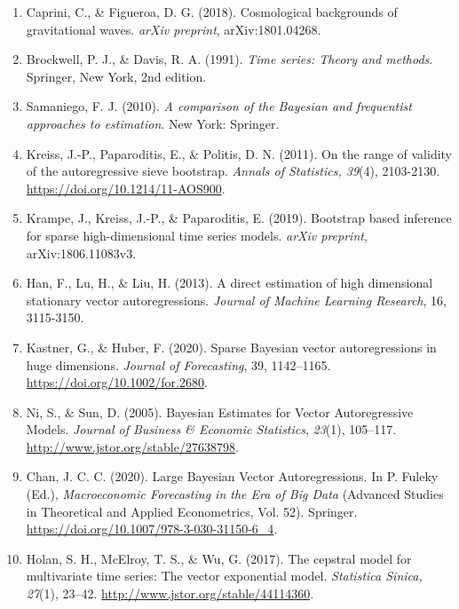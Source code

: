 \documentclass[12pt,a4paper]{article}
\begin{document}
\begin{enumerate}
\item \label{caprini2018} Caprini, C., \& Figueroa, D. G. (2018). Cosmological backgrounds of gravitational waves. \textit{arXiv preprint}, arXiv:1801.04268.

\item \label{BD1991} Brockwell, P. J., \& Davis, R. A. (1991). \emph{Time series: Theory and methods}. Springer, New York, 2nd edition.

\item \label{Samaniego (2010)} Samaniego, F. J. (2010). \emph{A comparison of the Bayesian and frequentist approaches to estimation}. New York: Springer.

\item \label{Kreiss2011} Kreiss, J.-P., Paparoditis, E., \& Politis, D. N. (2011). On the range of validity of the autoregressive sieve bootstrap. \emph{Annals of Statistics, 39}(4), 2103-2130. \url{https://doi.org/10.1214/11-AOS900}.

\item \label{Krampe2019} Krampe, J., Kreiss, J.-P., \& Paparoditis, E. (2019). Bootstrap based inference for sparse high-dimensional time series models. \emph{arXiv preprint}, arXiv:1806.11083v3.

\item \label{han2013} Han, F., Lu, H., \& Liu, H. (2013). A direct estimation of high dimensional stationary vector autoregressions. \textit{Journal of Machine Learning Research}, 16, 3115-3150.

\item \label{kastner2020} Kastner, G., \& Huber, F. (2020). Sparse Bayesian vector autoregressions in huge dimensions. \emph{Journal of Forecasting}, 39, 1142–1165. \url{https://doi.org/10.1002/for.2680}.

\item \label{ni2005} Ni, S., \& Sun, D. (2005). Bayesian Estimates for Vector Autoregressive Models. \emph{Journal of Business \& Economic Statistics}, \emph{23}(1), 105–117. \url{http://www.jstor.org/stable/27638798}.

\item \label{chan2020} Chan, J. C. C. (2020). Large Bayesian Vector Autoregressions. In P. Fuleky (Ed.), \emph{Macroeconomic Forecasting in the Era of Big Data} (Advanced Studies in Theoretical and Applied Econometrics, Vol. 52). Springer. \url{https://doi.org/10.1007/978-3-030-31150-6_4}.

\item \label{Holand 2017} Holan, S. H., McElroy, T. S., \& Wu, G. (2017). The cepstral model for multivariate time series: The vector exponential model. \emph{Statistica Sinica, 27}(1), 23–42. \url{http://www.jstor.org/stable/44114360}.


\end{enumerate}
\end{document}
